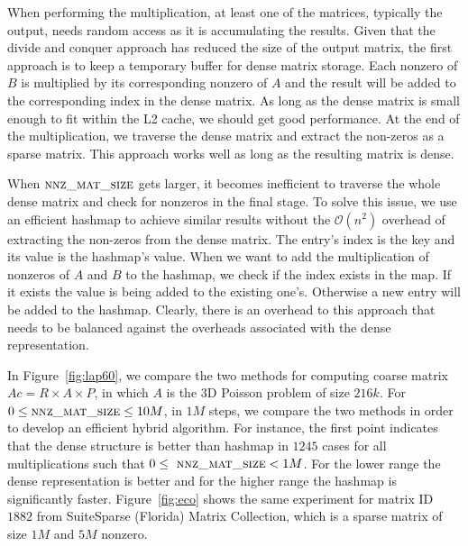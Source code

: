 When performing the multiplication, at least one of the matrices, typically the output, needs random access as it is accumulating the results. Given that the divide and conquer approach has reduced the size of the output matrix, the first approach is to keep a temporary buffer for dense matrix storage. Each nonzero of $B$ is multiplied by its corresponding nonzero of $A$ and the result will be added to the corresponding index in the dense matrix. As long as the dense matrix is small enough to fit within the L2 cache, we should get good performance. At the end of the multiplication, we traverse the dense matrix and extract the non-zeros as a sparse matrix. This approach works well as long as the resulting matrix is dense. 

When $\textsc{nnz\_mat\_size}$ gets larger, it becomes inefficient to traverse the whole dense matrix and check for nonzeros in the final stage. To solve this issue, we use an efficient hashmap to achieve similar results without the $\mathcal{O}(n^2)$ overhead of extracting the non-zeros from the dense matrix. The entry's index is the key and its value is the hashmap's value. When we want to add the multiplication of nonzeros of $A$ and $B$ to the hashmap, we check if the index exists in the map. If it exists the value is being added to the existing one's. Otherwise a new entry will be added to the hashmap. Clearly, there is an overhead to this approach that needs to be balanced against the overheads associated with the dense representation. 

In Figure~\ref{fig:lap60}, we compare the two methods for computing coarse matrix $Ac = R \times A \times P$, in which $A$ is the 3D Poisson problem of size $216k$. For $0 \leq \textsc{nnz\_mat\_size} \leq 10M$, in $1M$ steps, we compare the two methods in order to develop an efficient hybrid algorithm. For instance, the first point indicates that the dense structure is better than hashmap in $1245$ cases for all multiplications such that $0 \le\ \textsc{nnz\_mat\_size} < 1M$. For the lower range the dense representation is better and for the higher range the hashmap is significantly faster. Figure~\ref{fig:eco} shows the same experiment for matrix ID $1882$ from SuiteSparse (Florida) Matrix Collection, which is a sparse matrix of size $1M$ and $5M$ nonzero.

